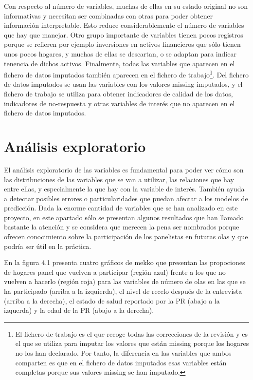 Con respecto al número de variables, muchas de ellas en su estado original no son informativas y necesitan ser combinadas con otras para poder obtener información interpretable. Esto reduce considerablemente el número de variables que hay que manejar. Otro grupo importante de variables tienen pocos registros porque se refieren por ejemplo inversiones en activos financieros que sólo tienen unos pocos hogares, y muchas de ellas se descartan, o se adaptan para indicar tenencia de dichos activos. Finalmente, todas las variables que aparecen en el fichero de datos imputados también aparecen en el fichero de trabajo\footnote{El fichero de trabajo es el que recoge todas las correcciones de la revisión y es el que se utiliza para imputar los valores que están missing porque los hogares no los han declarado. Por tanto, la diferencia en las variables que ambos comparten es que en el fichero de datos imputados esas variables están completas porque sus valores missing se han imputado.}. Del fichero de datos imputados se usan las variables con los valores missing imputados, y el fichero de trabajo se utiliza para obtener indicadores de calidad de los datos, indicadores de no-respuesta y otras variables de interés que no aparecen en el fichero de datos imputados.

\section{Análisis exploratorio}

El análisis exploratorio de las variables es fundamental para poder ver cómo son las distribuciones de las variables que se van a utilizar, las relaciones que hay entre ellas, y especialmente la que hay con la variable de interés. También ayuda a detectar posibles errores o particularidades que puedan afectar a los modelos de predicción. Dada la enorme cantidad de variables que se han analizado en este proyecto, en este apartado sólo se presentan algunos resultados que han llamado bastante la atención y se considera que merecen la pena ser nombrados porque ofrecen conocimiento sobre la participación de los panelistas en futuras olas y que podría ser útil en la práctica.

En la figura 4.1 presenta cuatro gráficos de mekko que presentan las propociones de hogares panel que vuelven a participar (región azul) frente a los que no vuelven a hacerlo (región roja) para las variables de número de olas en las que se ha participado (arriba a la izquierda), el nivel de recelo después de la entrevista (arriba a la derecha), el estado de salud reportado por la PR (abajo a la izquerda) y la edad de la PR (abajo a la derecha).

